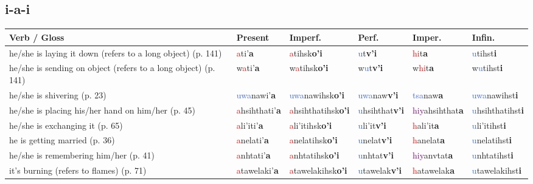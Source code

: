 \documentclass[oneside,openany]{book}%
\begin{document}
\subsection*{i-a-i}%
\begin{tabularx}{\textwidth}{>{\hsize=1.5\hsize\RaggedRight}X >{\hsize=0.9\hsize}X >{\hsize=0.9\hsize}X >{\hsize=0.9\hsize}X >{\hsize=0.9\hsize}X >{\hsize=0.9\hsize}X}%
\toprule%
\textbf{Verb / Gloss}&\textbf{Present}&\textbf{Imperf.}&\textbf{Perf.}&\textbf{Imper.}&\textbf{Infin.}\\%
\midrule%
he/she is laying it down (refers to a long object) (p. 141)&\textcolor{Red}{a}ti'\textbf{a}&\textcolor{Red}{a}tihsk\textbf{o'i}&\textcolor{RoyalBlue}{u}t\textbf{v'i}&\textcolor{Red}{hi}t\textbf{a}&\textcolor{RoyalBlue}{u}tihst\textbf{i}\\%
he/she is sending on object (refers to a long object) (p. 141)&w\textcolor{Red}{a}ti'\textbf{a}&w\textcolor{Red}{a}tihsk\textbf{o'i}&w\textcolor{RoyalBlue}{u}t\textbf{v'i}&w\textcolor{Red}{hi}t\textbf{a}&w\textcolor{RoyalBlue}{u}tihst\textbf{i}\\%
he/she is shivering (p. 23)&\textcolor{RoyalBlue}{uwa}nawi'\textbf{a}&\textcolor{RoyalBlue}{uwa}nawihsk\textbf{o'i}&\textcolor{RoyalBlue}{uwa}naw\textbf{v'i}&\textcolor{RoyalBlue}{tsa}naw\textbf{a}&\textcolor{RoyalBlue}{uwa}nawihst\textbf{i}\\%
he/she is placing his/her hand on him/her (p. 45)&\textcolor{Red}{a}hsihthati'\textbf{a}&\textcolor{Red}{a}hsihthatihsk\textbf{o'i}&\textcolor{RoyalBlue}{u}hsihthat\textbf{v'i}&\textcolor{Purple}{hiy}ahsihthat\textbf{a}&\textcolor{RoyalBlue}{u}hsihthatihst\textbf{i}\\%
he/she is exchanging it (p. 65)&\textcolor{Red}{a}li'iti'\textbf{a}&\textcolor{Red}{a}li'itihsk\textbf{o'i}&\textcolor{RoyalBlue}{u}li'it\textbf{v'i}&\textcolor{Red}{h}ali'it\textbf{a}&\textcolor{RoyalBlue}{u}li'itihst\textbf{i}\\%
he is getting married (p. 36)&\textcolor{Red}{a}nelati'\textbf{a}&\textcolor{Red}{a}nelatihsk\textbf{o'i}&\textcolor{RoyalBlue}{u}nelat\textbf{v'i}&\textcolor{Red}{h}anelat\textbf{a}&\textcolor{RoyalBlue}{u}nelatihst\textbf{i}\\%
he/she is remembering him/her (p. 41)&\textcolor{Red}{a}nhtati'\textbf{a}&\textcolor{Red}{a}nhtatihsk\textbf{o'i}&\textcolor{RoyalBlue}{u}nhtat\textbf{v'i}&\textcolor{Purple}{hiy}anvtat\textbf{a}&\textcolor{RoyalBlue}{u}nhtatihst\textbf{i}\\%
it's burning (refers to flames) (p. 71)&\textcolor{Red}{a}tawelaki'\textbf{a}&\textcolor{Red}{a}tawelakihsk\textbf{o'i}&\textcolor{RoyalBlue}{u}tawelak\textbf{v'i}&\textcolor{Red}{h}atawelak\textbf{a}&\textcolor{RoyalBlue}{u}tawelakihst\textbf{i}\\%

\end{tabularx}
\end{document}
